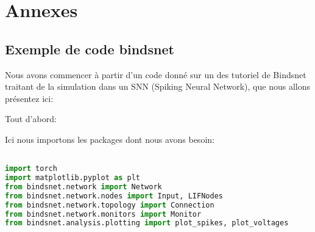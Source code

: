 \chapter{Annexes}

\section{Exemple de code bindsnet}
\label{codeBindsnet}
Nous avons commencer à partir d'un code donné sur un des tutoriel de Bindsnet traitant de la simulation dans un SNN (Spiking Neural Network), que nous allons présentez ici:

Tout d'abord:

Ici nous importons les packages dont nous avons besoin:

\begin{lstlisting}[language=Python]

import torch
import matplotlib.pyplot as plt
from bindsnet.network import Network
from bindsnet.network.nodes import Input, LIFNodes
from bindsnet.network.topology import Connection
from bindsnet.network.monitors import Monitor
from bindsnet.analysis.plotting import plot_spikes, plot_voltages

\end{lstlisting}


